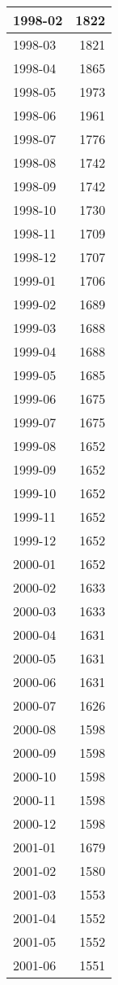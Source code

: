 \documentclass[
]{article}
\begin{document}
\begin{table}[H]
\begin{tabular}{l|r}
\hline
1998-02 & 1822\\
\hline
1998-03 & 1821\\
\hline
1998-04 & 1865\\
\hline
1998-05 & 1973\\
\hline
1998-06 & 1961\\
\hline
1998-07 & 1776\\
\hline
1998-08 & 1742\\
\hline
1998-09 & 1742\\
\hline
1998-10 & 1730\\
\hline
1998-11 & 1709\\
\hline
1998-12 & 1707\\
\hline
1999-01 & 1706\\
\hline
1999-02 & 1689\\
\hline
1999-03 & 1688\\
\hline
1999-04 & 1688\\
\hline
1999-05 & 1685\\
\hline
1999-06 & 1675\\
\hline
1999-07 & 1675\\
\hline
1999-08 & 1652\\
\hline
1999-09 & 1652\\
\hline
1999-10 & 1652\\
\hline
1999-11 & 1652\\
\hline
1999-12 & 1652\\
\hline
2000-01 & 1652\\
\hline
2000-02 & 1633\\
\hline
2000-03 & 1633\\
\hline
2000-04 & 1631\\
\hline
2000-05 & 1631\\
\hline
2000-06 & 1631\\
\hline
2000-07 & 1626\\
\hline
2000-08 & 1598\\
\hline
2000-09 & 1598\\
\hline
2000-10 & 1598\\
\hline
2000-11 & 1598\\
\hline
2000-12 & 1598\\
\hline
2001-01 & 1679\\
\hline
2001-02 & 1580\\
\hline
2001-03 & 1553\\
\hline
2001-04 & 1552\\
\hline
2001-05 & 1552\\
\hline
2001-06 & 1551\\

\end{tabular}
\end{table}
\end{document}
